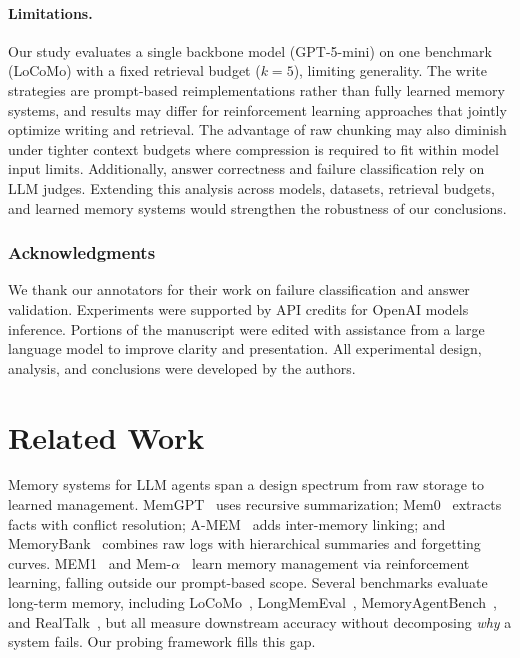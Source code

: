\documentclass{article} %
\begin{document}
\paragraph{Limitations.} Our study evaluates a single backbone model (GPT-5-mini) on one benchmark (LoCoMo) with a fixed retrieval budget ($k{=}5$), limiting generality. The write strategies are prompt-based reimplementations rather than fully learned memory systems, and results may differ for reinforcement learning approaches that jointly optimize writing and retrieval. The advantage of raw chunking may also diminish under tighter context budgets where compression is required to fit within model input limits. Additionally, answer correctness and failure classification rely on LLM judges. Extending this analysis across models, datasets, retrieval budgets, and learned memory systems would strengthen the robustness of our conclusions.


\subsubsection*{Acknowledgments}
We thank our annotators for their work on failure classification and answer validation. Experiments were supported by API credits for OpenAI models inference. Portions of the manuscript were edited with assistance from a large language model to improve clarity and presentation. All experimental design, analysis, and conclusions were developed by the authors.






\newpage
\appendix

\section{Related Work}
\label{app:related-work}

Memory systems for LLM agents span a design spectrum from raw storage to learned management. MemGPT~\citep{packer2023memgpt} uses recursive summarization; Mem0~\citep{chhikara2025mem0} extracts facts with conflict resolution; A-MEM~\citep{xu2025amem} adds inter-memory linking; and MemoryBank~\citep{zhong2023memorybankenhancinglargelanguage} combines raw logs with hierarchical summaries and forgetting curves. MEM1~\citep{zhou2025mem1learningsynergizememory} and Mem-$\alpha$~\citep{wang2025memalphalearningmemoryconstruction} learn memory management via reinforcement learning, falling outside our prompt-based scope. Several benchmarks evaluate long-term memory, including LoCoMo~\citep{maharana2024locomo}, LongMemEval~\citep{wu2025longmemeval}, MemoryAgentBench~\citep{hu2025evaluatingmemoryllmagents}, and RealTalk~\citep{lee2025realtalk21dayrealworlddataset}, but all measure downstream accuracy without decomposing \emph{why} a system fails. Our probing framework fills this gap.
\end{document}

